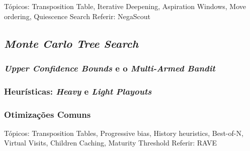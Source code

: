 \documentclass[12pt,a4paper,oneside]{article}
\begin{document}

Tópicos: Transposition Table, Iterative Deepening, Aspiration Windows, Move ordering, Quiescence Search
Referir: NegaScout

\lipsum[1]

\lipsum[2]

\lipsum[3]

\lipsum[4]

\lipsum[5]

\subsection{\textit{Monte Carlo Tree Search}}

\lipsum[1]

\lipsum[2]

\lipsum[3]

\subsubsection{\textit{Upper Confidence Bounds} e o \textit{Multi-Armed Bandit}}

\lipsum[1]

\lipsum[2]

\subsubsection{Heurísticas: \textit{Heavy} e \textit{Light} \textit{Playouts}}

\lipsum[1]

\lipsum[2]

\subsubsection{Otimizações Comuns}


Tópicos: Transposition Tables, Progressive bias, History heuristics, Best-of-N, Virtual Visits, Children Caching, Maturity Threshold
Referir: RAVE

\lipsum[1]

\lipsum[2]

\lipsum[3]

\lipsum[4]
\end{document}
